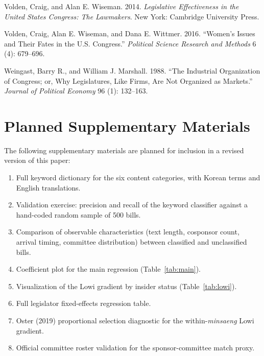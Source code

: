 \documentclass[11pt]{article}
\begin{document}
\begin{description}
\item Volden, Craig, and Alan E. Wiseman. 2014. \textit{Legislative Effectiveness in the United States Congress: The Lawmakers}. New York: Cambridge University Press.

\item Volden, Craig, Alan E. Wiseman, and Dana E. Wittmer. 2016. ``Women's Issues and Their Fates in the U.S. Congress.'' \textit{Political Science Research and Methods} 6 (4): 679--696.

\item Weingast, Barry R., and William J. Marshall. 1988. ``The Industrial Organization of Congress; or, Why Legislatures, Like Firms, Are Not Organized as Markets.'' \textit{Journal of Political Economy} 96 (1): 132--163.

\end{description}


\appendix
\section{Planned Supplementary Materials}\label{sec:appendix}

The following supplementary materials are planned for inclusion in a revised version of this paper:

\begin{enumerate}
\item Full keyword dictionary for the six content categories, with Korean terms and English translations.
\item Validation exercise: precision and recall of the keyword classifier against a hand-coded random sample of 500 bills.
\item Comparison of observable characteristics (text length, cosponsor count, arrival timing, committee distribution) between classified and unclassified bills.
\item Coefficient plot for the main regression (Table~\ref{tab:main}).
\item Visualization of the Lowi gradient by insider status (Table~\ref{tab:lowi}).
\item Full legislator fixed-effects regression table.
\item Oster (2019) proportional selection diagnostic for the within-\emph{minsaeng} Lowi gradient.
\item Official committee roster validation for the sponsor-committee match proxy.
\end{enumerate}
\end{document}
